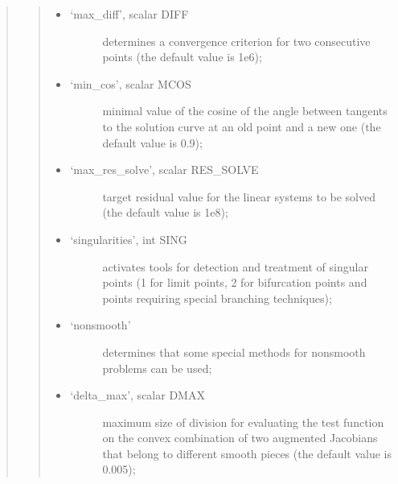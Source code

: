 \documentclass[a4paper,11pt,english]{sphinxmanual}
\begin{document}
\begin{quote}
\begin{quote}
\begin{itemize}
\item {} \begin{description}
\item[{‘max\_diff’, scalar DIFF}] \leavevmode
\sphinxAtStartPar
determines a convergence criterion for two consecutive points (the
default value is 1e\sphinxhyphen{}6);

\end{description}

\item {} \begin{description}
\item[{‘min\_cos’, scalar MCOS}] \leavevmode
\sphinxAtStartPar
minimal value of the cosine of the angle between tangents to the
solution curve at an old point and a new one (the default value is
0.9);

\end{description}

\item {} \begin{description}
\item[{‘max\_res\_solve’, scalar RES\_SOLVE}] \leavevmode
\sphinxAtStartPar
target residual value for the linear systems to be solved (the
default value is 1e\sphinxhyphen{}8);

\end{description}

\item {} \begin{description}
\item[{‘singularities’, int SING}] \leavevmode
\sphinxAtStartPar
activates tools for detection and treatment of singular points (1 for
limit points, 2 for bifurcation points and points requiring special
branching techniques);

\end{description}

\item {} \begin{description}
\item[{‘non\sphinxhyphen{}smooth’}] \leavevmode
\sphinxAtStartPar
determines that some special methods for non\sphinxhyphen{}smooth problems can be
used;

\end{description}

\item {} \begin{description}
\item[{‘delta\_max’, scalar DMAX}] \leavevmode
\sphinxAtStartPar
maximum size of division for evaluating the test function on the
convex combination of two augmented Jacobians that belong to different
smooth pieces (the default value is 0.005);


\end{description}
\end{itemize}
\end{quote}
\end{quote}
\end{document}
